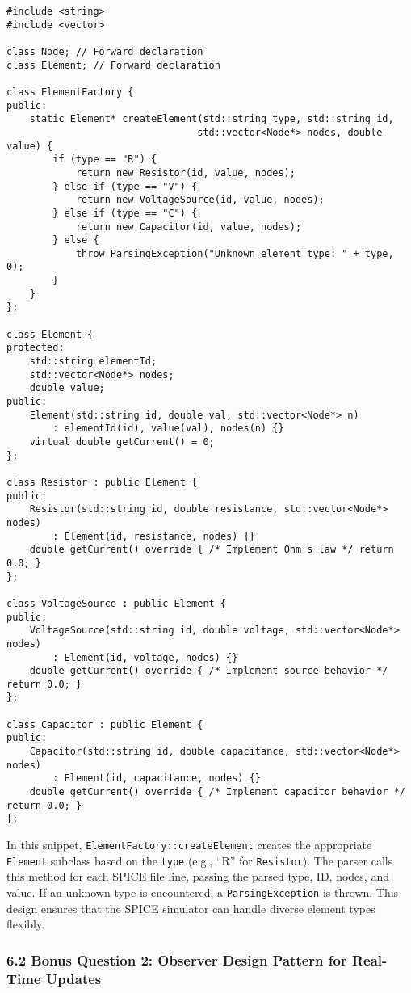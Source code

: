 \documentclass{article}
\begin{document}
\begin{lstlisting}
#include <string>
#include <vector>

class Node; // Forward declaration
class Element; // Forward declaration

class ElementFactory {
public:
    static Element* createElement(std::string type, std::string id, 
                                 std::vector<Node*> nodes, double value) {
        if (type == "R") {
            return new Resistor(id, value, nodes);
        } else if (type == "V") {
            return new VoltageSource(id, value, nodes);
        } else if (type == "C") {
            return new Capacitor(id, value, nodes);
        } else {
            throw ParsingException("Unknown element type: " + type, 0);
        }
    }
};

class Element {
protected:
    std::string elementId;
    std::vector<Node*> nodes;
    double value;
public:
    Element(std::string id, double val, std::vector<Node*> n) 
        : elementId(id), value(val), nodes(n) {}
    virtual double getCurrent() = 0;
};

class Resistor : public Element {
public:
    Resistor(std::string id, double resistance, std::vector<Node*> nodes)
        : Element(id, resistance, nodes) {}
    double getCurrent() override { /* Implement Ohm's law */ return 0.0; }
};

class VoltageSource : public Element {
public:
    VoltageSource(std::string id, double voltage, std::vector<Node*> nodes)
        : Element(id, voltage, nodes) {}
    double getCurrent() override { /* Implement source behavior */ return 0.0; }
};

class Capacitor : public Element {
public:
    Capacitor(std::string id, double capacitance, std::vector<Node*> nodes)
        : Element(id, capacitance, nodes) {}
    double getCurrent() override { /* Implement capacitor behavior */ return 0.0; }
};
\end{lstlisting}

In this snippet, \texttt{ElementFactory::createElement} creates the appropriate \texttt{Element} subclass based on the \texttt{type} (e.g., “R” for \texttt{Resistor}). The parser calls this method for each SPICE file line, passing the parsed type, ID, nodes, and value. If an unknown type is encountered, a \texttt{ParsingException} is thrown. This design ensures that the SPICE simulator can handle diverse element types flexibly.

\subsubsection*{6.2 Bonus Question 2: Observer Design Pattern for Real-Time Updates}
\end{document}
